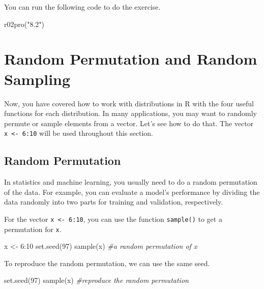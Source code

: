 \documentclass[
]{book}
\newenvironment{Shaded}{\begin{snugshade}}{\end{snugshade}}
\newcommand{\CommentTok}[1]{\textcolor[rgb]{0.56,0.35,0.01}{\textit{#1}}}
\newcommand{\DecValTok}[1]{\textcolor[rgb]{0.00,0.00,0.81}{#1}}
\newcommand{\FunctionTok}[1]{\textcolor[rgb]{0.00,0.00,0.00}{#1}}
\newcommand{\NormalTok}[1]{#1}
\newcommand{\OtherTok}[1]{\textcolor[rgb]{0.56,0.35,0.01}{#1}}
\newcommand{\SpecialCharTok}[1]{\textcolor[rgb]{0.00,0.00,0.00}{#1}}
\newcommand{\StringTok}[1]{\textcolor[rgb]{0.31,0.60,0.02}{#1}}
\begin{document}
You can run the following code to do the exercise.

\begin{Shaded}
\begin{Highlighting}[]
\FunctionTok{r02pro}\NormalTok{(}\StringTok{"8.2"}\NormalTok{)}
\end{Highlighting}
\end{Shaded}

\hypertarget{sampling}{%
\section{Random Permutation and Random Sampling}\label{sampling}}

Now, you have covered how to work with distributions in R with the four useful functions for each distribution. In many applications, you may want to randomly permute or sample elements from a vector. Let's see how to do that. The vector \texttt{x\ \textless{}-\ 6:10} will be used throughout this section.

\hypertarget{random-permutation}{%
\subsection{Random Permutation}\label{random-permutation}}

In statistics and machine learning, you usually need to do a random permutation of the data. For example, you can evaluate a model's performance by dividing the data randomly into two parts for training and validation, respectively.

For the vector \texttt{x\ \textless{}-\ 6:10}, you can use the function \texttt{sample()} to get a permutation for \texttt{x}.

\begin{Shaded}
\begin{Highlighting}[]
\NormalTok{x }\OtherTok{\textless{}{-}} \DecValTok{6}\SpecialCharTok{:}\DecValTok{10}
\FunctionTok{set.seed}\NormalTok{(}\DecValTok{97}\NormalTok{)}
\FunctionTok{sample}\NormalTok{(x)  }\CommentTok{\#a random permutation of x}
\end{Highlighting}
\end{Shaded}

To reproduce the random permutation, we can use the same seed.

\begin{Shaded}
\begin{Highlighting}[]
\FunctionTok{set.seed}\NormalTok{(}\DecValTok{97}\NormalTok{)}
\FunctionTok{sample}\NormalTok{(x)  }\CommentTok{\#reproduce the random permutation}
\end{Highlighting}
\end{Shaded}
\end{document}
